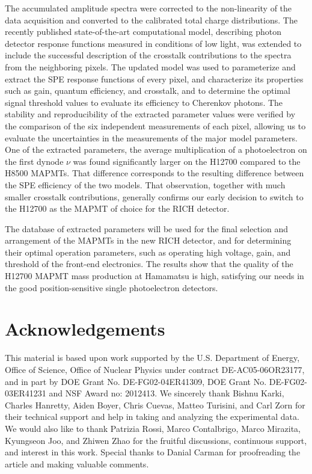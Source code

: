 The accumulated amplitude spectra were corrected to the non-linearity of the data acquisition and converted to the calibrated total charge distributions. The recently published state-of-the-art computational model, describing photon detector response functions measured in conditions of low light, was extended to include the successful description of the crosstalk contributions to the spectra from the neighboring pixels. The updated model was used to parameterize and extract the SPE response functions of every pixel, and characterize its properties such as gain, quantum efficiency, and crosstalk, and to determine the optimal signal threshold values to evaluate its efficiency to Cherenkov photons. The stability and reproducibility of the extracted parameter values were verified by the comparison of the six independent measurements of each pixel, allowing us to evaluate the uncertainties in the measurements of the major model parameters. One of the extracted parameters, the average multiplication of a photoelectron on the first dynode $\nu$ was found significantly larger on the H12700 compared to the H8500 MAPMTs. That difference corresponds to the resulting difference between the SPE efficiency of the two models.  That observation, together with much smaller crosstalk contributions, generally confirms our early decision to switch to the H12700 as the MAPMT of choice for the RICH detector.

The database of extracted parameters will be used for the final selection and arrangement of the MAPMTs in the new RICH detector, and for determining their optimal operation parameters, such as operating high voltage, gain, and threshold of the front-end electronics. The results show that the quality of the H12700 MAPMT mass production at Hamamatsu is high, satisfying our needs in the good position-sensitive single photoelectron detectors.



\section{Acknowledgements}
This material is based upon work supported by the U.S. Department of Energy, Office of Science, Office of Nuclear Physics under contract DE-AC05-06OR23177, and in part by DOE Grant No. DE-FG02-04ER41309, DOE Grant No. DE-FG02-03ER41231 and NSF Award no: 2012413. 
We sincerely thank 
Bishnu Karki,
Charles Hanretty,
Aiden Boyer,
Chris  Cuevas,
Matteo Turisini, and
Carl Zorn
for their technical support and help in taking and analyzing the experimental data. We would
also like to thank 
Patrizia Rossi, 
Marco Contalbrigo, 
Marco Mirazita,
Kyungseon Joo,
and Zhiwen Zhao
for the fruitful discussions, continuous support, and interest in this work. Special thanks to Danial Carman for proofreading the article and making valuable comments.